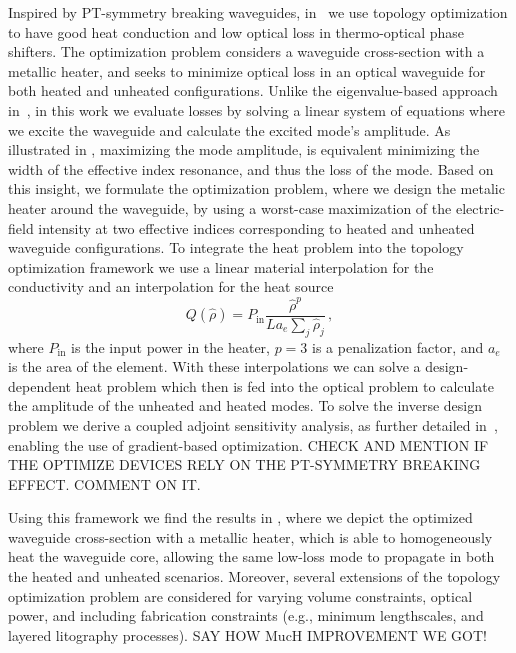 Inspired by PT-symmetry breaking waveguides, in~\cite{ownpub0} we use topology optimization to have good heat conduction and low optical loss in thermo-optical phase shifters.
The optimization problem considers a waveguide cross-section with a metallic heater, and seeks to minimize optical loss in an optical waveguide for both heated and 
unheated configurations. Unlike the eigenvalue-based approach in~\cite{lipson}, in this work we evaluate losses by solving a linear system of equations where we excite the waveguide 
and calculate the excited mode's 
amplitude. As illustrated in , maximizing the mode amplitude, is equivalent minimizing the width of the effective 
index resonance, and thus the loss of the mode. Based on this insight, we formulate the optimization problem, where we design the metalic heater around the waveguide, by using a worst-case maximization 
of the electric-field intensity at two effective indices corresponding to heated and unheated 
waveguide configurations. To integrate the heat problem into the topology optimization framework we use a linear material interpolation 
for the conductivity and an interpolation for the heat source
\begin{equation}
    Q(\hat{\rho})=P_{\text{in}} \frac{\hat{\rho}^p}{L a_e \sum_j \hat{\rho}_j}\,,
\end{equation}
where $P_\text{in}$ is the input power in the heater, $p=3$ is a penalization factor, and $a_e$ is the area of the element. With these interpolations we can solve a design-dependent
heat problem which then is fed into the optical problem to calculate the amplitude of the unheated and heated modes. To solve the inverse design
problem we derive a coupled adjoint sensitivity analysis, as further detailed in~\cite{ownpub0}, enabling the use of gradient-based optimization. CHECK AND
MENTION IF THE OPTIMIZE DEVICES RELY ON THE PT-SYMMETRY BREAKING EFFECT. COMMENT ON IT.

Using this framework we find the results in , where we depict the optimized waveguide cross-section with a metallic heater, which is able to homogeneously heat the waveguide core,
allowing the same low-loss mode to propagate in both the heated and unheated scenarios. Moreover, several extensions of the topology optimization problem are considered for varying volume constraints, optical power, and including fabrication constraints (e.g., minimum lengthscales, and layered 
litography processes). SAY HOW MucH IMPROVEMENT WE GOT!

